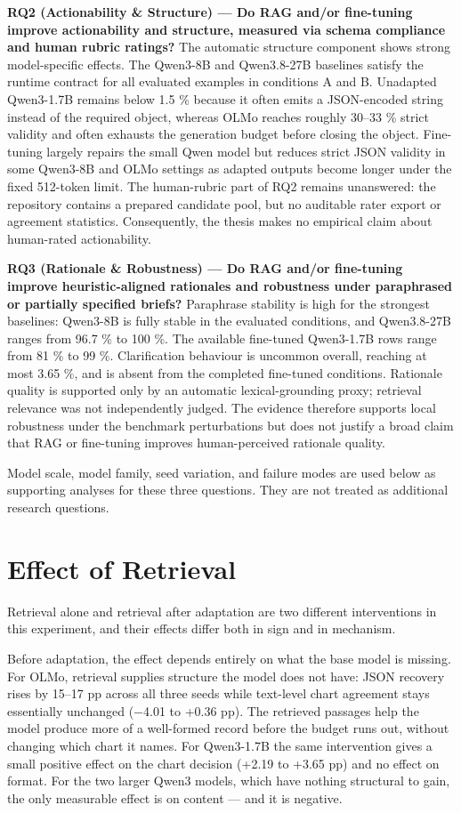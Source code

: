 \textbf{RQ2 (Actionability \& Structure) --- Do RAG and/or fine-tuning improve actionability and structure, measured via schema compliance and human rubric ratings?} The automatic structure component shows strong model-specific effects. The Qwen3-8B and Qwen3.8-27B baselines satisfy the runtime contract for all evaluated examples in conditions A and B. Unadapted Qwen3-1.7B remains below 1.5 \% because it often emits a JSON-encoded string instead of the required object, whereas OLMo reaches roughly 30--33 \% strict validity and often exhausts the generation budget before closing the object. Fine-tuning largely repairs the small Qwen model but reduces strict JSON validity in some Qwen3-8B and OLMo settings as adapted outputs become longer under the fixed 512-token limit. The human-rubric part of RQ2 remains unanswered: the repository contains a prepared candidate pool, but no auditable rater export or agreement statistics. Consequently, the thesis makes no empirical claim about human-rated actionability.

\textbf{RQ3 (Rationale \& Robustness) --- Do RAG and/or fine-tuning improve heuristic-aligned rationales and robustness under paraphrased or partially specified briefs?} Paraphrase stability is high for the strongest baselines: Qwen3-8B is fully stable in the evaluated conditions, and Qwen3.8-27B ranges from 96.7 \% to 100 \%. The available fine-tuned Qwen3-1.7B rows range from 81 \% to 99 \%. Clarification behaviour is uncommon overall, reaching at most 3.65 \%, and is absent from the completed fine-tuned conditions. Rationale quality is supported only by an automatic lexical-grounding proxy; retrieval relevance was not independently judged. The evidence therefore supports local robustness under the benchmark perturbations but does not justify a broad claim that RAG or fine-tuning improves human-perceived rationale quality.

Model scale, model family, seed variation, and failure modes are used below as supporting analyses for these three questions. They are not treated as additional research questions.

\section{Effect of Retrieval}

Retrieval alone and retrieval after adaptation are two different interventions in this experiment, and their effects differ both in sign and in mechanism.

Before adaptation, the effect depends entirely on what the base model is missing. For OLMo, retrieval supplies structure the model does not have: JSON recovery rises by 15--17 pp across all three seeds while text-level chart agreement stays essentially unchanged (\ensuremath{-}4.01 to +0.36 pp). The retrieved passages help the model produce more of a well-formed record before the budget runs out, without changing which chart it names. For Qwen3-1.7B the same intervention gives a small positive effect on the chart decision (+2.19 to +3.65 pp) and no effect on format. For the two larger Qwen3 models, which have nothing structural to gain, the only measurable effect is on content --- and it is negative.


